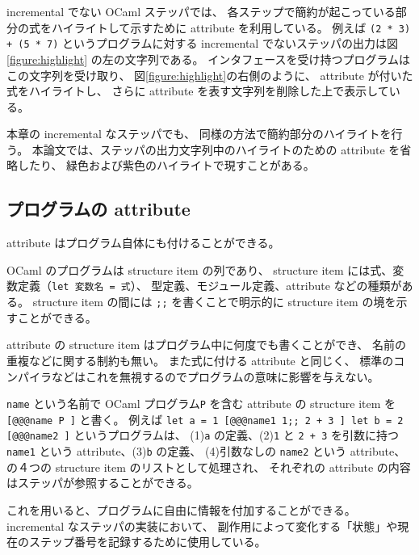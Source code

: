 incremental でない OCaml ステッパでは、
各ステップで簡約が起こっている部分の式をハイライトして示すために
attribute を利用している。
例えば \texttt{(2 * 3) + (5 * 7)} というプログラムに対する
incremental でないステッパの出力は図 \ref{figure:highlight} の左の文字列である。
インタフェースを受け持つプログラムはこの文字列を受け取り、
図\ref{figure:highlight}の右側のように、
attribute が付いた式をハイライトし、
さらに attribute を表す文字列を削除した上で表示している。

本章の incremental なステッパでも、
同様の方法で簡約部分のハイライトを行う。
本論文では、ステッパの出力文字列中のハイライトのための attribute を省略したり、
緑色および紫色のハイライトで現すことがある。

\subsection{プログラムの attribute}
\label{OCamlのattribute-プログラムのattribute}
attribute はプログラム自体にも付けることができる。

OCaml のプログラムは structure item の列であり、
structure item には式、変数定義（\texttt{let 変数名 = 式}）、
型定義、モジュール定義、attribute などの種類がある。
structure item の間には \texttt{;;} を書くことで明示的に structure item の境を示すことができる。

attribute の structure item はプログラム中に何度でも書くことができ、
名前の重複などに関する制約も無い。
また式に付ける attribute と同じく、
標準のコンパイラなどはこれを無視するのでプログラムの意味に影響を与えない。

\texttt{name} という名前で OCaml プログラム\texttt{P}
を含む attribute の structure item を \texttt{[@@@name P ]} と書く。
例えば \texttt{let a = 1 [@@@name1 1;; 2 + 3 ] let b = 2 [@@@name2 ]}
というプログラムは、
(1)\texttt{a} の定義、(2)\texttt{1} と \texttt{2 + 3}
を引数に持つ \texttt{name1} という attribute、(3)\texttt{b} の定義、
(4)引数なしの \texttt{name2} という attribute、
の４つの structure item のリストとして処理され、
それぞれの attribute の内容はステッパが参照することができる。

これを用いると、プログラムに自由に情報を付加することができる。
incremental なステッパの実装において、
副作用によって変化する「状態」や現在のステップ番号を記録するために使用している。
